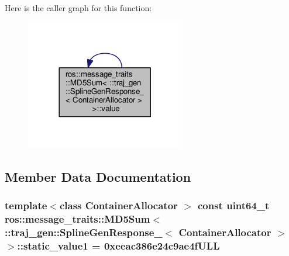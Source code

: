 Here is the caller graph for this function\+:
\nopagebreak
\begin{figure}[H]
\begin{center}
\leavevmode
\includegraphics[width=197pt]{structros_1_1message__traits_1_1_m_d5_sum_3_01_1_1traj__gen_1_1_spline_gen_response___3_01_container_allocator_01_4_01_4_a8f5fb8b4c364ef6077fcd9fe71f8989d_icgraph}
\end{center}
\end{figure}




\subsection{Member Data Documentation}
\subsubsection[{\texorpdfstring{static\+\_\+value1}{static_value1}}]{\setlength{\rightskip}{0pt plus 5cm}template$<$class Container\+Allocator $>$ const uint64\+\_\+t ros\+::message\+\_\+traits\+::\+M\+D5\+Sum$<$ \+::{\bf traj\+\_\+gen\+::\+Spline\+Gen\+Response\+\_\+}$<$ Container\+Allocator $>$ $>$\+::static\+\_\+value1 = 0xeeac386e24c9ae4f\+U\+LL\hspace{0.3cm}{\ttfamily [static]}}\hypertarget{structros_1_1message__traits_1_1_m_d5_sum_3_01_1_1traj__gen_1_1_spline_gen_response___3_01_container_allocator_01_4_01_4_aa69be38c0336c19665130efd88f9f02e}{}\label{structros_1_1message__traits_1_1_m_d5_sum_3_01_1_1traj__gen_1_1_spline_gen_response___3_01_container_allocator_01_4_01_4_aa69be38c0336c19665130efd88f9f02e}



